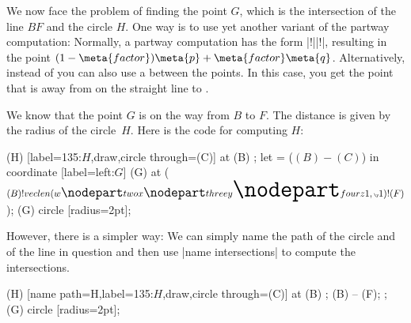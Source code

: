 We now face the problem of finding the point $G$, which is the intersection of
the line $BF$ and the circle $H$. One way is to use yet another variant of the
partway computation: Normally, a partway computation has the form
|!||!|, resulting in the point
$(1-\meta{factor})\meta{p} + \meta{factor}\meta{q}$. Alternatively, instead of
 you can also use a  between the points. In this
case, you get the point that is  away from  on the
straight line to .

We know that the point $G$ is on the way from $B$ to $F$. The distance is given
by the radius of the circle~$H$. Here is the code for computing $H$:
%
{\ifpgfmanualexternalize\tikzexternaldisable\fi
\begin{codeexample}[
    preamble={\usetikzlibrary{calc,through}},
    pre={\begin{tikzpicture}
  \coordinate [label=left:$A$]  (A) at (0,0);
  \coordinate [label=right:$B$] (B) at (0.75,0.25);
  \coordinate [label=above:$C$] (C) at (1,1.5);
  \draw (A) -- (B) -- (C);
  \coordinate [label=above:$D$] (D) at
    ($ (A) ! .5 ! (B) ! {sin(60)*2} ! 90:(B) $) {};
  \draw (D) -- ($ (D) ! 3.5 ! (B) $) coordinate [label=below:$F$] (F);
  \draw (D) -- ($ (D) ! 2.5 ! (A) $) coordinate [label=below:$E$] (E);},
    post={\end{tikzpicture}},
]
  \node (H) [label=135:$H$,draw,circle through=(C)] at (B) {};
  \path let  = ($ (B) - (C) $) in
    coordinate [label=left:$G$] (G) at ($ (B) ! veclen(\x1,\y1) ! (F) $);
  \fill[red,opacity=.5] (G) circle [radius=2pt];
\end{codeexample}

However, there is a simpler way: We can simply name the path of the circle and
of the line in question and then use |name intersections| to compute the
intersections.
%
\begin{codeexample}[
    preamble={\usetikzlibrary{calc,intersections,through}},
    pre={\begin{tikzpicture}
  \coordinate [label=left:$A$]  (A) at (0,0);
  \coordinate [label=right:$B$] (B) at (0.75,0.25);
  \coordinate [label=above:$C$] (C) at (1,1.5);
  \draw (A) -- (B) -- (C);
  \coordinate [label=above:$D$] (D) at
    ($ (A) ! .5 ! (B) ! {sin(60)*2} ! 90:(B) $) {};
  \draw (D) -- ($ (D) ! 3.5 ! (B) $) coordinate [label=below:$F$] (F);
  \draw (D) -- ($ (D) ! 2.5 ! (A) $) coordinate [label=below:$E$] (E);},
    post={\end{tikzpicture}},
]
  \node (H) [name path=H,label=135:$H$,draw,circle through=(C)] at (B) {};
  \path [name path=B--F] (B) -- (F);
  \path [name intersections={of=H and B--F,by={[label=left:$G$]G}}];
  \fill[red,opacity=.5] (G) circle [radius=2pt];
\end{codeexample}
}%


